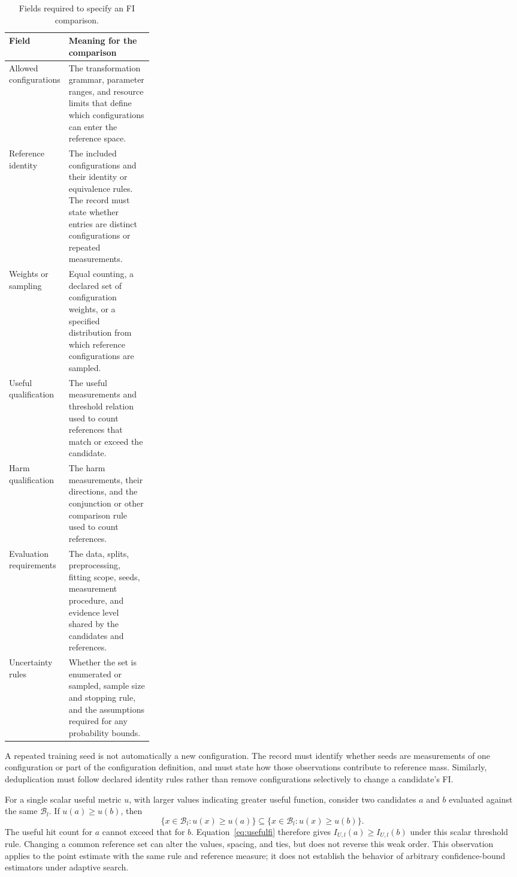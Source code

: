 \documentclass[manuscript,screen,nonacm]{acmart}
\begin{document}
\begin{table}[htbp]
\caption{Fields required to specify an FI comparison.}
\label{tab:reference-contract}
\centering
\begin{tabularx}{\linewidth}{>{\raggedright\arraybackslash}p{0.28\linewidth}>{\raggedright\arraybackslash}X}
\toprule
\textbf{Field} & \textbf{Meaning for the comparison} \\
\midrule
Allowed configurations & The transformation grammar, parameter ranges, and resource limits that define which configurations can enter the reference space. \\
Reference identity & The included configurations and their identity or equivalence rules. The record must state whether entries are distinct configurations or repeated measurements. \\
Weights or sampling & Equal counting, a declared set of configuration weights, or a specified distribution from which reference configurations are sampled. \\
Useful qualification & The useful measurements and threshold relation used to count references that match or exceed the candidate. \\
Harm qualification & The harm measurements, their directions, and the conjunction or other comparison rule used to count references. \\
Evaluation requirements & The data, splits, preprocessing, fitting scope, seeds, measurement procedure, and evidence level shared by the candidates and references. \\
Uncertainty rules & Whether the set is enumerated or sampled, sample size and stopping rule, and the assumptions required for any probability bounds. \\
\bottomrule
\end{tabularx}
\end{table}

A repeated training seed is not automatically a new configuration. The record must identify whether seeds are measurements of one configuration or part of the configuration definition, and must state how those observations contribute to reference mass. Similarly, deduplication must follow declared identity rules rather than remove configurations selectively to change a candidate's FI.

For a single scalar useful metric $u$, with larger values indicating greater useful function, consider two candidates $a$ and $b$ evaluated against the same $\mathcal{B}_l$. If $u(a)\ge u(b)$, then
\[
\{x\in\mathcal{B}_l:u(x)\ge u(a)\}
\subseteq
\{x\in\mathcal{B}_l:u(x)\ge u(b)\}.
\]
The useful hit count for $a$ cannot exceed that for $b$. Equation~\ref{eq:usefulfi} therefore gives $I_{U,l}(a)\ge I_{U,l}(b)$ under this scalar threshold rule. Changing a common reference set can alter the values, spacing, and ties, but does not reverse this weak order. This observation applies to the point estimate with the same rule and reference measure; it does not establish the behavior of arbitrary confidence-bound estimators under adaptive search.
\end{document}
